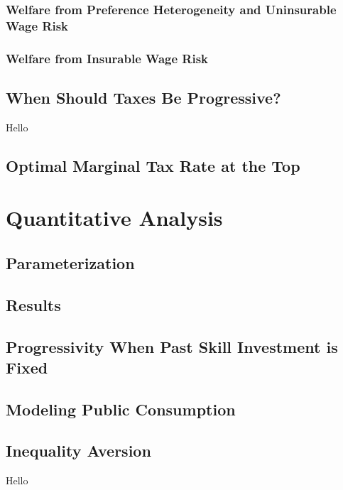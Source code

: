 \documentclass{article}
\begin{document}
\subsubsection{Welfare from Preference Heterogeneity and Uninsurable Wage Risk}

\subsubsection{Welfare from Insurable Wage Risk}


\subsection{When Should Taxes Be Progressive?}

{
\proposition Hello

}

\subsection{Optimal Marginal Tax Rate at the Top}

\section{Quantitative Analysis}

\subsection{Parameterization}

\subsection{Results}

\subsection{Progressivity When Past Skill Investment is Fixed}

\subsection{Modeling Public Consumption}

\subsection{Inequality Aversion}

{
\proposition Hello

}
\end{document}
